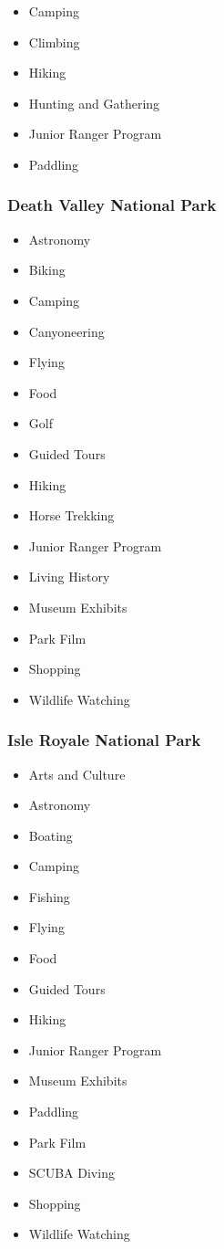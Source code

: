 \documentclass[
  letterpaper,
  DIV=11,
  numbers=noendperiod]{scrartcl}
\providecommand{\tightlist}{%
  \setlength{\itemsep}{0pt}\setlength{\parskip}{0pt}}\usepackage{longtable,booktabs,array}
\begin{document}
\begin{itemize}
\tightlist
\item
  Camping
\item
  Climbing
\item
  Hiking
\item
  Hunting and Gathering
\item
  Junior Ranger Program
\item
  Paddling
\end{itemize}

\subsubsection{Death Valley National
Park}\label{death-valley-national-park}

\begin{itemize}
\tightlist
\item
  Astronomy
\item
  Biking
\item
  Camping
\item
  Canyoneering
\item
  Flying
\item
  Food
\item
  Golf
\item
  Guided Tours
\item
  Hiking
\item
  Horse Trekking
\item
  Junior Ranger Program
\item
  Living History
\item
  Museum Exhibits
\item
  Park Film
\item
  Shopping
\item
  Wildlife Watching
\end{itemize}

\subsubsection{Isle Royale National
Park}\label{isle-royale-national-park}

\begin{itemize}
\tightlist
\item
  Arts and Culture
\item
  Astronomy
\item
  Boating
\item
  Camping
\item
  Fishing
\item
  Flying
\item
  Food
\item
  Guided Tours
\item
  Hiking
\item
  Junior Ranger Program
\item
  Museum Exhibits
\item
  Paddling
\item
  Park Film
\item
  SCUBA Diving
\item
  Shopping
\item
  Wildlife Watching
\end{itemize}
\end{document}
